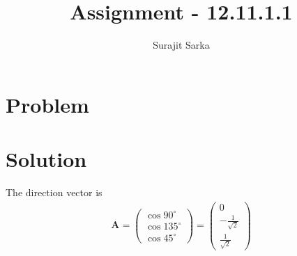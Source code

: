 \documentclass[journal,12pt,twocolumn]{IEEEtran}
\title{\mytitle}
\title{
Assignment - 12.11.1.1
}
\author{Surajit Sarka}
\newcommand{\myvec}[1]{\ensuremath{\begin{pmatrix}#1\end{pmatrix}}}
\let\vec\mathbf
\begin{document}
\maketitle
\tableofcontents
\bigskip
\section{\textbf{Problem}}
\section{\textbf{Solution}}
\fi
The direction vector is
\begin{align}
\vec{A}=\myvec{\cos 90^{\circ}\\ \cos 135^{\circ}\\ \cos 45^{\circ}}=\myvec{0\\-\frac{1}{\sqrt{2}}\\ \frac{1}{\sqrt{2}}}
\end{align}
\end{document}
